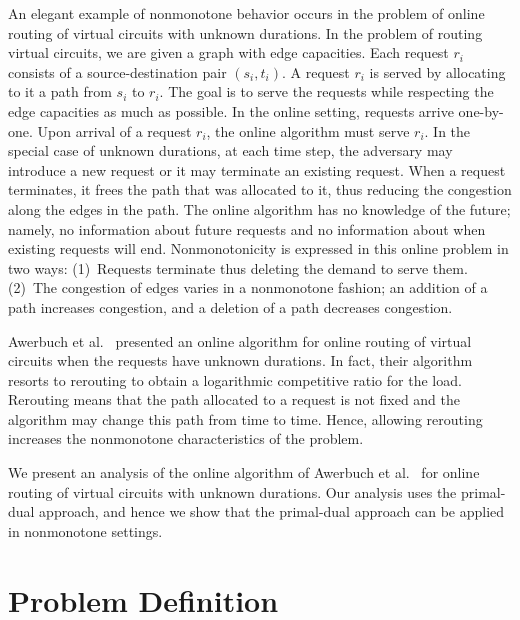 \documentclass[11pt]{article}
\newenvironment{proof sketch}[1]{\noindent {\emph{Proof sketch of #1:}}}{\hfill \qed}
\begin{document}
An elegant example of nonmonotone behavior occurs in the problem of
online routing of virtual circuits with unknown durations. In the
problem of routing virtual circuits, we are given a graph with edge
capacities. Each request $r_i$ consists of a
source-destination pair $(s_i,t_i)$.  A request $r_i$ is served by
allocating to it a path from $s_i$ to $r_i$. The goal is to serve the
requests while respecting the edge capacities as much as possible. In
the online setting, requests arrive one-by-one. Upon arrival of a
request $r_i$, the online algorithm must serve $r_i$. In the special
case of unknown durations, at each time step, the adversary may
introduce a new request or it may terminate an existing request.  When
a request terminates, it frees the path that was allocated to it, thus
reducing the congestion along the edges in the path.  The online
algorithm has no knowledge of the future; namely, no information about
future requests and no information about when existing requests will
end. Nonmonotonicity is expressed in this online problem in two ways:
(1)~Requests terminate thus deleting the demand to serve them. (2)~The
congestion of edges varies in a nonmonotone fashion; an addition of a
path increases congestion, and a deletion of a path decreases
congestion.

Awerbuch et al.~\cite{awerbuch2001competitive} presented an online
algorithm for online routing of virtual circuits when the requests
have unknown durations. In fact, their algorithm resorts to rerouting
to obtain a logarithmic competitive ratio for the load. Rerouting means
that the path allocated to a request is not fixed and the algorithm
may change this path from time to time. Hence, allowing rerouting
increases the nonmonotone characteristics of the problem.

We present an analysis of the online algorithm of Awerbuch et
al.~\cite{awerbuch2001competitive} for online routing of virtual circuits with
unknown durations. Our analysis uses the primal-dual approach, and hence
we show that the primal-dual approach can be applied in nonmonotone
settings.







\section{Problem Definition}
\end{document}
